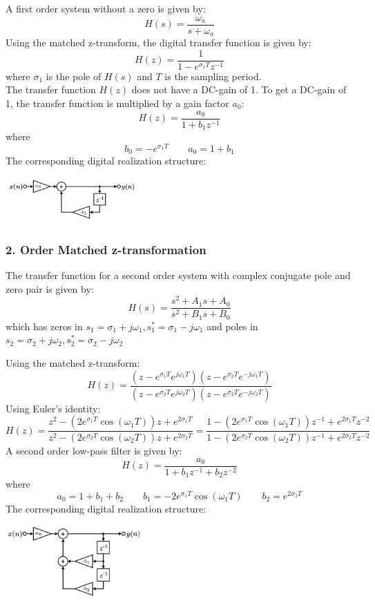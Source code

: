 A first order system without a zero is given by:
$$H(s)=\frac{\omega_a}{s+\omega_a}$$
Using the matched z-transform, the digital transfer function is given by:
$$H(z)=\frac{1}{1-e^{\sigma_1 T}z^{-1}}$$
where $\sigma_1$ is the pole of $H(s)$ and $T$ is the sampling period.\\
The transfer function $H(z)$ does not have a DC-gain of 1. To get a DC-gain of 1, the transfer function is multiplied by a gain factor $a_0$:
$$H(z)=\frac{a_0}{1+b_1z^{-1}}$$
where
$$b_0=-e^{\sigma_1 T} \qquad a_0=1+b_1$$
The corresponding digital realization structure:
\begin{center}
  \includegraphics[width=0.4\textwidth]{Images/Matched-z-1th.png}
\end{center}
\subsubsection{2. Order Matched z-transformation}
The transfer function for a second order system with complex conjugate pole and zero pair is given by:
$$H(s)={\frac{s^{2}+A_{1}s+A_{0}}{s^{2}+B_{1}s+B_{0}}}$$
which has zeros in $s_1=\sigma_1+j\omega_1,s_1^*=\sigma_1-j\omega_1$ and poles in $s_2=\sigma_2+j\omega_2,s_2^*=\sigma_2-j\omega_2$

Using the matched z-transform:
$$H(z)={\frac{(z-e^{\sigma_{1}T}e^{j\omega_{1}T})(z-e^{\sigma_{2}T}e^{-j\omega_{1}T})}{(z-e^{\sigma_{2}T}e^{j\omega_{2}T})(z-e^{\sigma_{2}T}e^{-j\omega_{2}T})}}$$
Using Euler's identity:
$$H(z)=\frac{z^{2}-(2e^{\sigma_{1}T}\cos(\omega_{1}T))z+e^{2\sigma_{1}T}}{z^{2}-(2e^{\sigma_{2}T}\cos(\omega_{2}T))z+e^{2\sigma_{2}T}}=\frac{1-(2e^{\sigma_{1}T}\cos(\omega_{1}T))z^{-1}+e^{2\sigma_{1}T}z^{-2}}{1-(2e^{\sigma_{2}T}\cos(\omega_{2}T))z^{-1}+e^{2\sigma_{2}T}z^{-2}}$$
A second order low-pass filter is given by:
$$H(z)=\frac{a_0}{1+b_1z^{-1}+b_2z^{-2}}$$
where
$$a_0=1+b_1+b_2 \qquad b_1=-2e^{\sigma_1 T}\cos(\omega_1 T) \qquad b_2=e^{2\sigma_2 T}$$
The corresponding digital realization structure:
\begin{center}
  \includegraphics[width=0.4\textwidth]{Images/Matched-z-2nd.png}
\end{center}
